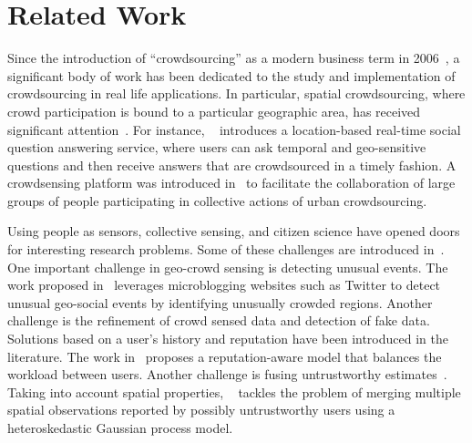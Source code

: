 \documentclass{acm_proc_article-sp}
\begin{document}
\section{Related Work}
Since the introduction of ``crowdsourcing'' as a modern business term in 2006~\cite{howe2006rise}, a significant body of work has been dedicated to the study and implementation of crowdsourcing in real life applications. In particular, spatial crowdsourcing, where crowd participation is bound to a particular geographic area, has received significant attention~\cite{kazemi2012geocrowd, deng2013maximizing, yu2015quality}. For instance, ~\cite{liu2013using} introduces a location-based real-time social question answering service, where users can ask temporal and geo-sensitive questions and then receive answers that are crowdsourced in a timely fashion. A crowdsensing platform was introduced in~\cite{cardone2013fostering} to facilitate the collaboration of large groups of people participating in collective actions of urban crowdsourcing.\par

Using people as sensors, collective sensing, and citizen science have opened doors for interesting research problems. Some of these challenges are introduced in~\cite{blaschke2011collective}. One important challenge in geo-crowd sensing is detecting unusual events. The work proposed in~\cite{lee2010measuring} leverages microblogging websites such as Twitter to detect unusual geo-social events by identifying unusually crowded regions. Another challenge is the refinement of crowd sensed data and detection of fake data. Solutions based on a user's history and reputation have been introduced in the literature. The work in~\cite{yu2013reputation} proposes a reputation-aware model that balances the workload between users. Another challenge is fusing untrustworthy estimates~\cite{venanzi2013trust}. Taking into account spatial properties, ~\cite{venanzi2013crowdsourcing} tackles the problem of merging multiple spatial observations reported by possibly untrustworthy users using a heteroskedastic Gaussian process model.\par
\end{document}
